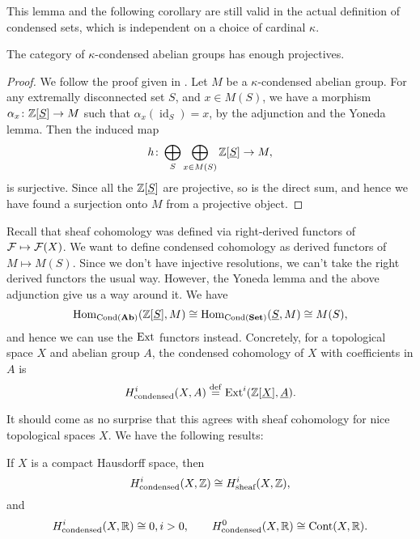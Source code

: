 \documentclass{article}
\DeclareMathOperator{\Cont}{Cont}
\DeclareMathOperator{\id}{id}
\DeclareMathOperator{\Cond}{Cond}
\begin{document}
This lemma and the following corollary are still valid in the actual definition of condensed sets,
which is independent on a choice of cardinal $\kappa$.
\begin{corollary}
    The category of $\kappa$-condensed abelian groups has enough projectives.
\end{corollary}
\begin{proof}
    We follow the proof given in \cite[Theorem 2.2.6]{Dag2021FoundationsCM}.
    Let $M$ be a $\kappa$-condensed abelian group. For any extremally
    disconnected set $S$, and $x\in M(S)$, we have a morphism
    $\alpha_x \colon \mathbb{Z}[\underline{S}] \to M$ such that $\alpha_x(\id_{S}) = x$,
    by the adjunction and the Yoneda lemma. Then the induced map
    \begin{equation*}
        h \colon \bigoplus_S \bigoplus_{x\in M(S)}\mathbb{Z}[\underline{S}] \to M,
    \end{equation*}
    is surjective. Since all the $\mathbb{Z}[\underline{S}]$ are projective,
    so is the direct sum, and hence we have found a surjection onto $M$
    from a projective object.
\end{proof}

\medskip
Recall that sheaf cohomology was defined via right-derived
functors of $\mathcal{F} \mapsto \mathcal{F}(X)$. We want to define
condensed cohomology as derived functors of $M \mapsto M(S)$.
Since we don't have injective resolutions, we can't take
the right derived functors the usual way. However, the
Yoneda lemma and the above adjunction give us a way around it.
We have
\begin{equation*}
    \Hom_{\Cond(\Ab)}(\bbZ[\underline{S}], M) \cong
    \Hom_{\Cond(\Set)}(\underline{S}, M) \cong
    M(S),
\end{equation*}
and hence we can use the $\operatorname{Ext}$ functors instead.
Concretely, for a topological space $X$ and abelian group $A$,
the condensed cohomology of $X$ with coefficients in $A$ is
\begin{equation*}
    H^i_{\text{condensed}}(X, A) \overset{\mathrm{def}}{=} \operatorname{Ext}^i(\mathbb{Z}[\underline{X}], \underline{A}).
\end{equation*}

It should come as no surprise that this agrees with sheaf cohomology
for nice topological spaces $X$. We have the following results:
\begin{theorem}
    If $X$ is a compact Hausdorff space, then
    \begin{equation*}
        H^i_{\textrm{condensed}}(X, \mathbb{Z}) \cong H^i_{\textrm{sheaf}}(X, \mathbb{Z}),
    \end{equation*}
    and
    \begin{equation*}
        H^i_{\textrm{condensed}}(X, \bbR) \cong 0, i>0,\qquad
        H^0_{\textrm{condensed}}(X, \bbR) \cong \Cont(X, \bbR).
    \end{equation*}
\end{theorem}

\nocite{Apa2021condensed}


\end{document}
